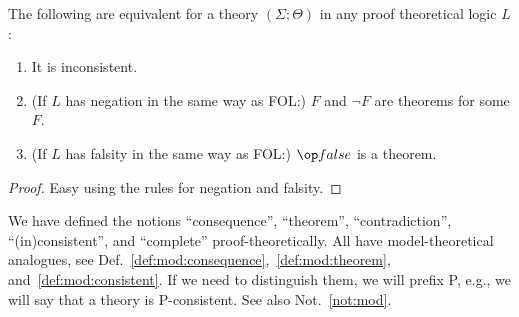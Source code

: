 \begin{lemma}\label{lem:pf:inconsistent}
The following are equivalent for a theory $(\Sigma;\Theta)$ in any proof theoretical logic $L$:
\begin{enumerate}
	\item It is inconsistent.
	\item (If $L$ has negation in the same way as FOL:) $F$ and $\neg F$ are theorems for some $F$.
	\item (If $L$ has falsity in the same way as FOL:) $\false$ is a theorem.
\end{enumerate}
\end{lemma}
\begin{proof}
Easy using the rules for negation and falsity.
\end{proof}


\begin{notation}\label{not:pf}
We have defined the notions ``consequence'', ``theorem'', ``contradiction'', ``(in)consistent'', and ``complete'' proof-theoretically. All have model-theoretical analogues, see Def.~\ref{def:mod:consequence},~\ref{def:mod:theorem}, and~\ref{def:mod:consistent}. If we need to distinguish them, we will prefix P, e.g., we will say that a theory is P-consistent. See also Not.~\ref{not:mod}.
\end{notation}
\bigskip